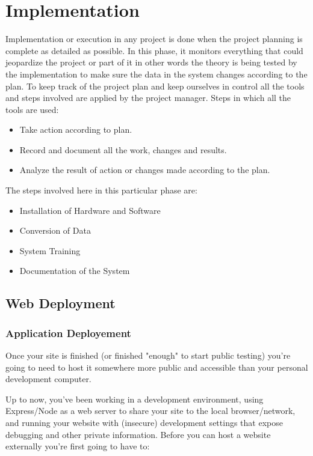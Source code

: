 \section{Implementation}
		\vs
		Implementation or execution in any project is done when the project planning is complete as detailed as possible. In this phase, it monitors everything that could jeopardize the project or part of it in other words the theory is being tested by the implementation to make sure the data in the system changes according to the plan. To keep track of the project plan and keep ourselves in control all the tools and steps involved are applied by the project manager. 
		\vs
		Steps in which all the tools are used: 
		\begin{itemize}
			\item Take action according to plan. 
			\item Record and document all the work, changes and results.
			\item Analyze the result of action or changes made according to the plan. 
		\end{itemize}
		\vs
		The steps involved here in this particular phase are: 
		\vs
		\begin{itemize}
			\item Installation of Hardware and Software 
			\item Conversion of Data 
			\item System Training 
			\item Documentation of the System
		\end{itemize}
		\vs
		\subsection{Web Deployment}
		\vs
		\subsubsection{Application Deployement}
			Once your site is finished (or finished "enough" to start public testing) you're going to need to host it somewhere more public and accessible than your personal development computer.
			
			Up to now, you've been working in a development environment, using Express/Node as a web server to share your site to the local browser/network, and running your website with (insecure) development settings that expose debugging and other private information. Before you can host a website externally you're first going to have to:
			
